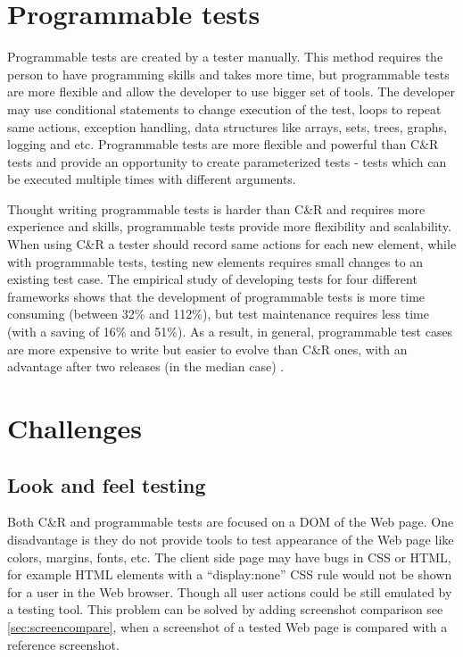 \section{Programmable tests} 
\label{sec:programTests}
Programmable tests are created by a tester manually. This method requires the
person to have programming skills and takes more time, but programmable tests
are more flexible and allow the developer to use bigger set of tools. The
developer may use conditional statements to change execution of the test,
loops to repeat same actions, exception handling, data structures like
arrays, sets, trees, graphs, logging and etc. Programmable tests are more
flexible and powerful than C\&R tests and provide an opportunity to create
parameterized tests - tests which can be executed multiple times with different arguments. 

Thought writing programmable tests is harder than C\&R and requires more
 experience and skills, programmable tests provide more flexibility and
 scalability. When using C\&R a tester should record same actions for
each new element, while with  programmable tests, testing new elements requires
small changes to an existing test case.
The empirical study of developing tests for four different frameworks shows that the development of 
programmable tests is more time consuming (between 32\% and 112\%), but test
maintenance requires less time (with a saving of 16\% and 51\%). 
As a result, in general, programmable test cases are more
expensive to write but easier to evolve than C\&R ones, with an advantage
after two releases (in the median case) \cite{CaptureReplay7}.

\section {Challenges}
	\label {sec:challenges}
	\subsection{Look and feel testing}
	    Both C\&R and programmable tests are focused on a DOM of the Web page.
	    One disadvantage is they do not provide tools to test appearance of the Web
	    page like colors, margins, fonts, etc. The client side page may have bugs in CSS
	    or HTML, for example HTML elements with a ``display:none'' CSS rule would
	    not be shown for a user in the Web browser.
	    Though all user actions could be still emulated by a testing tool. 
	    This problem can be solved by adding screenshot
      comparison see \ref{sec:screencompare}, when a screenshot of a tested Web
      page is compared with a reference screenshot. 

